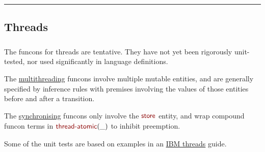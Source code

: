 

\begin{center}
\rule{3in}{0.4pt}
\end{center}

\subsection{Threads}\hypertarget{threads}{}\label{threads}

\begin{align*}
  [ \
  \textsf{Multithreading
          } \ & \textsf{} \\
  \textsf{Synchronising
          } \ & \textsf{} \\
  \textsf{Locks
          } \ & \textsf{} \\
  \textsf{Notifications
          } \ & \textsf{}
  \ ]
\end{align*}
The funcons for threads are tentative. They have not yet been rigorously
unit-tested, nor used significantly in language definitions.

The \href{Multithreading}{multithreading} funcons involve multiple mutable entities, and are
generally specified by inference rules with premises involving the values of
those entities before and after a transition.

The \href{Synchronising}{synchronising} funcons only involve the $\SHADE{\NAME{store}}$ entity, and wrap
compound funcon terms in $\SHADE{\NAME{thread-atomic}
           (  \_ )}$ to inhibit preemption.

Some of the unit tests are based on examples in an \href{https://www.ibm.com/support/knowledgecenter/ssw_aix_72/com.ibm.aix.genprogc/chapter12.htm}{IBM threads} guide.




